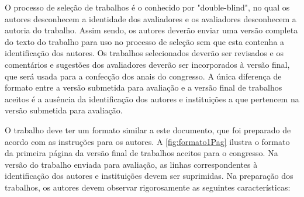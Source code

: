 \documentclass{anpet}
\begin{document}
O processo de seleção de trabalhos é o conhecido por "double-blind", no qual os autores desconhecem a identidade dos avaliadores e os avaliadores desconhecem a autoria do trabalho. Assim sendo, os autores deverão enviar uma versão completa do texto do trabalho para uso no processo de seleção sem que esta contenha a identificação dos autores. Os trabalhos selecionados deverão ser revisados e os comentários e sugestões dos avaliadores deverão ser incorporados à versão final, que será usada para a confecção dos anais do congresso.
A única diferença de formato entre a versão submetida para avaliação e a versão final de trabalhos aceitos é a ausência da identificação dos autores e instituições a que pertencem na versão submetida para avaliação.

O trabalho deve ter um formato similar a este documento, que foi preparado de acordo com as instruções para os autores. A \autoref{fig:formato1Pag} ilustra o formato da primeira página da versão final de trabalhos aceitos para o congresso. Na versão do trabalho enviada para avaliação, as linhas correspondentes à identificação dos autores e instituições devem ser suprimidas. Na preparação dos trabalhos, os autores devem observar rigorosamente as seguintes características:
\end{document}
